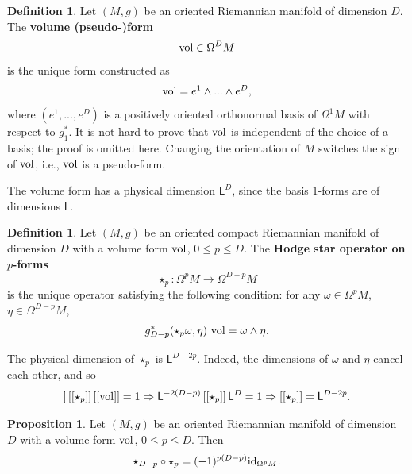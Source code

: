 \documentclass{elsarticle}
\theoremstyle{definition}
\newtheorem{proposition}[theorem]{Proposition}
\newtheorem{definition}[theorem]{Definition}
\newcommand{\vol}{\mathop{\rm vol}\nolimits}
\newcommand{\newterm}[1]{\textbf{#1}}
\newcommand{\length}{\mathsf{L}}
\begin{document}
\begin{definition}
  Let $(M, g)$ be an oriented Riemannian manifold of dimension $D$.
  The \newterm{volume (pseudo-)form}
  \begin{equation}
    \vol \in \Omega^D M
  \end{equation}
  is the unique form constructed as
  \begin{equation}
    \vol = e^1 \wedge ... \wedge e^D,
  \end{equation}
  where $(e^1, ..., e^D)$ is a positively oriented orthonormal basis of $\Omega^1 M$ with respect to $g^*_1$.
  It is not hard to prove that $\vol$ is independent of the choice of a basis; the proof is omitted here.
  Changing the orientation of $M$ switches the sign of $\vol$, i.e., $\vol$ is a pseudo-form.

  The volume form has a physical dimension $\length^D$, since the basis $1$-forms are of dimensions $\length$.
\end{definition}
\begin{definition}
  Let $(M, g)$ be an oriented compact Riemannian manifold of dimension $D$ with a volume form $\vol$, $0 \leq p \leq D$.
  The \newterm{Hodge star operator on $p$-forms}
  \begin{equation}
    \star_p \colon \Omega^p M \to \Omega^{D - p} M
  \end{equation}
  is the unique operator satisfying the following condition: for any
  $\omega \in \Omega^p M$,
  $\eta \in \Omega^{D - p} M$,
  \begin{equation}
    \label{eq:exterior_calculus/hodge_star}
    g^*_{D - p}(\star_p \omega, \eta)\, \vol = \omega \wedge \eta.
  \end{equation}

  The physical dimension of $\star_p$ is $\length^{D - 2 p}$.
  Indeed, the dimensions of $\omega$ and $\eta$ cancel each other, and so
  \begin{equation}
    [[g^*_{D - p}]]\, [[\star_p]]\, [[\vol]] = 1
    \Rightarrow \length^{-2 (D - p)}\, [[\star_p]]\, \length^D = 1
    \Rightarrow [[\star_p]] = \length^{D - 2 p}.
  \end{equation}
\end{definition}
\begin{proposition}
  Let $(M, g)$ be an oriented Riemannian manifold of dimension $D$ with a volume form $\vol$, $0 \leq p \leq D$.
  Then
  \begin{equation}
    \star_{D - p} \circ \star_p = (-1)^{p (D - p)} {\rm id}_{\Omega^p M}.
  \end{equation}
\end{proposition}
\end{document}
